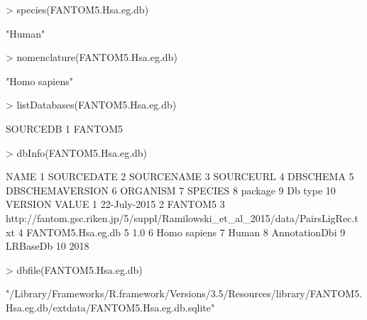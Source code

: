 \documentclass[11pt,a4paper,english,arial,twoside]{article}
\begin{document}
\begin{center}
\begin{Schunk}
\begin{Sinput}
> species(FANTOM5.Hsa.eg.db)
\end{Sinput}
\begin{Soutput}
[1] "Human"
\end{Soutput}
\begin{Sinput}
> nomenclature(FANTOM5.Hsa.eg.db)
\end{Sinput}
\begin{Soutput}
[1] "Homo sapiens"
\end{Soutput}
\begin{Sinput}
> listDatabases(FANTOM5.Hsa.eg.db)
\end{Sinput}
\begin{Soutput}
  SOURCEDB
1  FANTOM5
\end{Soutput}
\begin{Sinput}
> dbInfo(FANTOM5.Hsa.eg.db)
\end{Sinput}
\begin{Soutput}
              NAME
1       SOURCEDATE
2       SOURCENAME
3        SOURCEURL
4         DBSCHEMA
5  DBSCHEMAVERSION
6         ORGANISM
7          SPECIES
8          package
9          Db type
10         VERSION
                                                                           VALUE
1                                                                   22-July-2015
2                                                                        FANTOM5
3  http://fantom.gsc.riken.jp/5/suppl/Ramilowski_et_al_2015/data/PairsLigRec.txt
4                                                              FANTOM5.Hsa.eg.db
5                                                                            1.0
6                                                                   Homo sapiens
7                                                                          Human
8                                                                  AnnotationDbi
9                                                                       LRBaseDb
10                                                                          2018
\end{Soutput}
\begin{Sinput}
> dbfile(FANTOM5.Hsa.eg.db)
\end{Sinput}
\begin{Soutput}
[1] "/Library/Frameworks/R.framework/Versions/3.5/Resources/library/FANTOM5.Hsa.eg.db/extdata/FANTOM5.Hsa.eg.db.sqlite"
\end{Soutput}

\end{Schunk}
\end{center}
\end{document}
